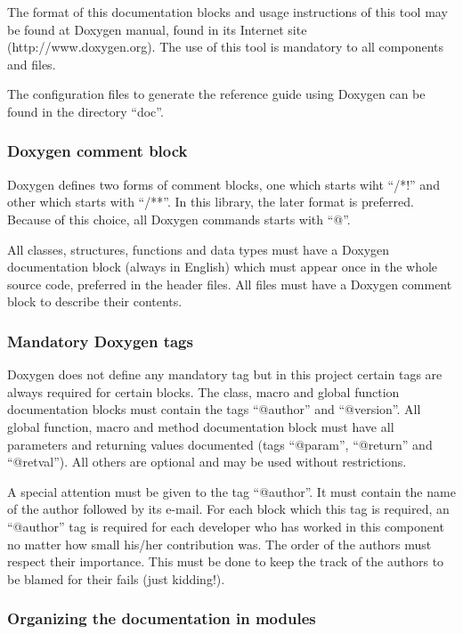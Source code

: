 The format of this documentation blocks and usage instructions of this tool may be found at Doxygen manual, found in its Internet site (http://www.doxygen.org). The use of this tool is mandatory to all \libname{ } components and files.

The configuration files to generate the reference guide using Doxygen can be found in the directory ``doc''.

\subsubsection{Doxygen comment block}

Doxygen defines two forms of comment blocks, one which starts wiht ``/*!'' and other which starts with ``/**''. In this library, the later format is preferred. Because of this choice, all Doxygen commands starts with ``@''.

All classes, structures, functions and data types must have a Doxygen documentation block (always in English) which must appear once in the whole source code, preferred in the header files. All files must have a Doxygen comment block to describe their contents.

\subsubsection{Mandatory Doxygen tags}

Doxygen does not define any mandatory tag but in this project certain tags are always required for certain blocks. The class, macro and global function documentation blocks  must contain the tags ``@author'' and ``@version''. All global function, macro and method documentation block must have all parameters and returning values documented (tags ``@param'', ``@return'' and ``@retval''). All others are optional and may be used without restrictions.

A special attention must be given to the tag ``@author''. It must contain the name of the author followed by its e-mail. For each block which this tag is required, an ``@author'' tag is required for each developer who has worked in this component no matter how small his/her contribution was. The order of the authors must respect their importance. This must be done to keep the track of the authors to be blamed for their fails (just kidding!).

\subsubsection{Organizing the documentation in modules}

